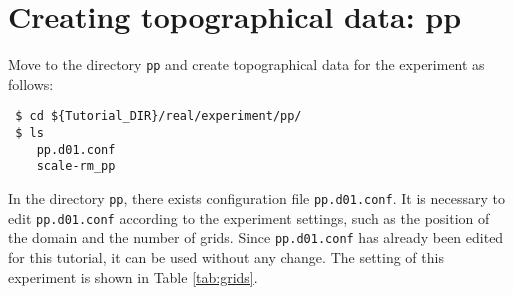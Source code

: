 \section{Creating topographical data: pp} \label{sec:tutrial_real_pp}

Move to the directory \verb|pp| and create topographical data for the experiment as follows:
\begin{verbatim}
 $ cd ${Tutorial_DIR}/real/experiment/pp/
 $ ls
    pp.d01.conf
    scale-rm_pp
\end{verbatim}
In the directory \verb|pp|, there exists configuration file \verb|pp.d01.conf|.
It is necessary to edit \verb|pp.d01.conf| according to the experiment settings,
such as the position of the domain and the number of grids.
Since \verb|pp.d01.conf| has already been edited for this tutorial, it can be used without any change.
The setting of this experiment is shown in Table \ref{tab:grids}.

